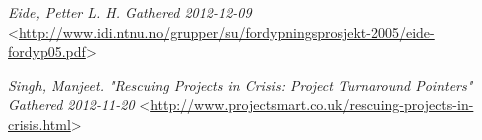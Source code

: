 \begin{thebibliography}{99}     
	

 \emph{Eide, Petter L. H.  Gathered 2012-12-09 } <\url{http://www.idi.ntnu.no/grupper/su/fordypningsprosjekt-2005/eide-fordyp05.pdf}>

 \emph{Singh, Manjeet. \textsl{"Rescuing Projects in Crisis: Project Turnaround Pointers"} Gathered 2012-11-20} <\url{http://www.projectsmart.co.uk/rescuing-projects-in-crisis.html}> 

\end{thebibliography}
